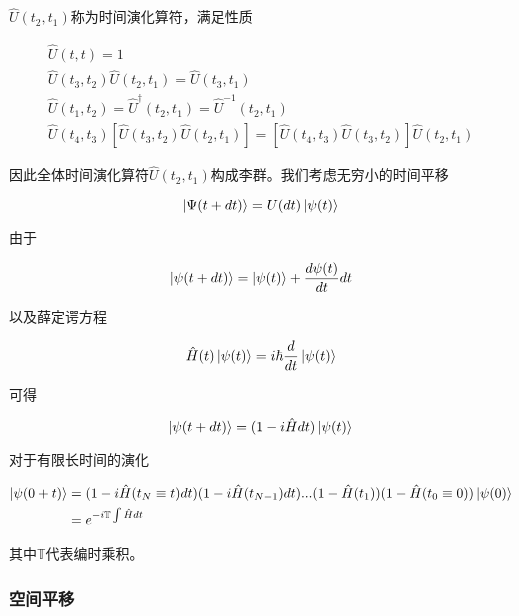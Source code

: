 $\hat{U}(t_2,t_1)$称为时间演化算符，满足性质

\begin{equation}
    \begin{array}{lr}
        \hat{U}(t,t)=1 \\
        \hat{U}(t_3,t_2)\hat{U}(t_2,t_1)=\hat{U}(t_3,t_1) \\
        \hat{U}(t_1,t_2)=\hat{U}^\dagger(t_2,t_1)=\hat{U}^{-1}(t_2,t_1) \\
        \hat{U}(t_4,t_3)[\hat{U}(t_3,t_2)\hat{U}(t_2,t_1)]=[\hat{U}(t_4,t_3)\hat{U}(t_3,t_2)]\hat{U}(t_2,t_1)
    \end{array}
\end{equation}

因此全体时间演化算符$\hat{U}(t_2,t_1)$构成李群。我们考虑无穷小的时间平移

\begin{equation}
    \ket{\Psi(t+dt)}=U(dt)\ket{\psi(t)}
\end{equation}

由于

\begin{equation}
    \ket{\psi(t+dt)}=\ket{\psi(t)}+\frac{d\psi(t)}{dt}dt
\end{equation}

以及薛定谔方程

\begin{equation}
    \hat{H}(t)\ket{\psi(t)}=i\hbar\frac{d}{dt}\ket{\psi(t)}
\end{equation}

可得

\begin{equation}
    \ket{\psi(t+dt)}=(1-i\hat{H}dt)\ket{\psi(t)}
\end{equation}

对于有限长时间的演化

\begin{equation}
    \begin{split}
        \ket{\psi(0+t)}&=(1-i\hat{H}(t_N\equiv t)dt)(1-i\hat{H}(t_{N-1})dt)...(1-\hat{H}(t_1))(1-\hat{H}(t_0\equiv 0))\ket{\psi(0)} \\
            &=e^{-i\mathbb{T}\int\hat{H}dt}
    \end{split}
\end{equation}

其中$\mathbb{T}$代表编时乘积。

\subsubsection{空间平移}

